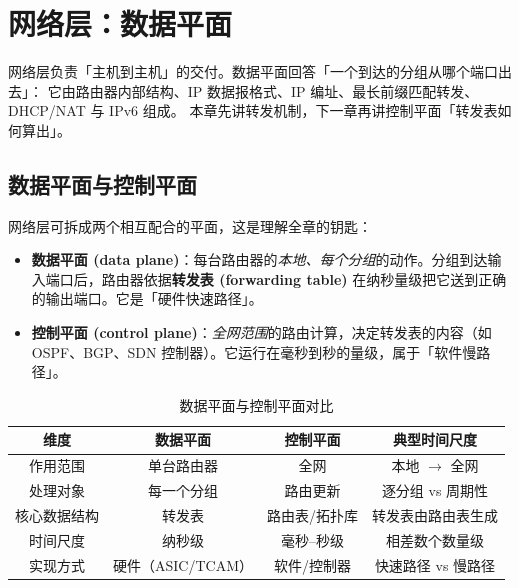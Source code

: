 \clearpage
\begingroup
\let\clearpage\relax
\let\cleardoublepage\relax
\vspace*{\fill}
\chapter{网络层：数据平面}
\begin{center}
网络层负责「主机到主机」的交付。数据平面回答「一个到达的分组从哪个端口出去」：
它由路由器内部结构、IP 数据报格式、IP 编址、最长前缀匹配转发、DHCP/NAT 与 IPv6 组成。
本章先讲转发机制，下一章再讲控制平面「转发表如何算出」。
\end{center}
\vspace*{\fill}
\endgroup
\clearpage

\section{数据平面与控制平面}

网络层可拆成两个相互配合的平面，这是理解全章的钥匙：

\begin{itemize}
    \item \textbf{数据平面 (data plane)}：每台路由器的\emph{本地、每个分组}的动作。分组到达输入端口后，路由器依据\textbf{转发表 (forwarding table)} 在纳秒量级把它送到正确的输出端口。它是「硬件快速路径」。
    \item \textbf{控制平面 (control plane)}：\emph{全网范围}的路由计算，决定转发表的内容（如 OSPF、BGP、SDN 控制器）。它运行在毫秒到秒的量级，属于「软件慢路径」。
\end{itemize}

\begin{table}[H]
\centering
\caption{数据平面与控制平面对比}
\begin{tabulary}{\textwidth}{CCCC}
\toprule
维度 & 数据平面 & 控制平面 & 典型时间尺度 \\
\midrule
作用范围 & 单台路由器 & 全网 & 本地 $\to$ 全网 \\
处理对象 & 每一个分组 & 路由更新 & 逐分组 vs 周期性 \\
核心数据结构 & 转发表 & 路由表/拓扑库 & 转发表由路由表生成 \\
时间尺度 & 纳秒级 & 毫秒--秒级 & 相差数个数量级 \\
实现方式 & 硬件（ASIC/TCAM） & 软件/控制器 & 快速路径 vs 慢路径 \\
\bottomrule
\end{tabulary}
\end{table}

